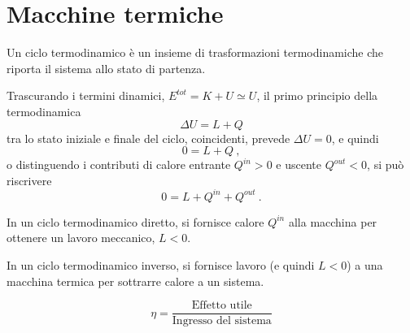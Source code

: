 \chapter{Macchine termiche}\label{thermodynamics:thermal_machines}
\begin{definition} Un ciclo termodinamico è un insieme di trasformazioni termodinamiche che riporta il sistema allo stato di partenza.
\end{definition}
Trascurando i termini dinamici, $E^{tot} = K + U \simeq U$, il primo principio della termodinamica
\begin{equation}
    \Delta U = L + Q
\end{equation}
tra lo stato iniziale e finale del ciclo, coincidenti, prevede $\Delta U = 0$, e quindi
\begin{equation}
    0 = L + Q \ ,
\end{equation}
o distinguendo i contributi di calore entrante $Q^{in} > 0$ e uscente $Q^{out} < 0$, si può riscrivere
\begin{equation}
    0 = L + Q^{in} + Q^{out} \ .
\end{equation}

\begin{definition} In un ciclo termodinamico diretto, si fornisce calore $Q^{in}$ alla macchina per ottenere un lavoro meccanico, $L<0$.
\end{definition}
\begin{example}
\end{example}
\begin{example}
\end{example}
\begin{example}
\end{example}

\begin{definition} In un ciclo termodinamico inverso, si fornisce lavoro (e quindi $L < 0$) a una macchina termica per sottrarre calore a un sistema.
\end{definition}
\begin{example}[Frigorifero]
\end{example}

\begin{definition}
    \begin{equation}
        \eta = \dfrac{\text{Effetto utile}}{\text{Ingresso del sistema}}
    \end{equation}
\end{definition}


